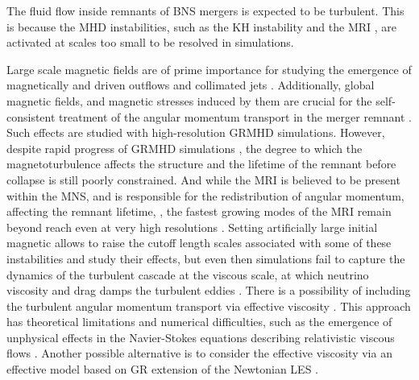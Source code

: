 
The fluid flow inside remnants of \ac{BNS} mergers is expected to be turbulent. 
This is because the \ac{MHD} instabilities,
such as the \ac{KH} instability and the \ac{MRI} \citep{Balbus:1991}, are  
activated at scales too small to be resolved in simulations.

Large scale magnetic fields are of prime importance for studying the emergence of magnetically 
and driven outflows and collimated jets  \cite{Rezzolla:2011da,Bucciantini:2011kx,Siegel:2014ita,Ruiz:2016rai,Metzger:2018uni}.
%
Additionally, global magnetic fields, and magnetic stresses induced by them are crucial for the self-consistent treatment of the angular momentum transport in the merger remnant \citep{Duez:2006qe,Kiuchi:2014hja,Guilet:2016sqd,Kiuchi:2017zzg}.
%
Such effects are studied with high-resolution \ac{GRMHD} simulations. 
However, despite rapid progress of \ac{GRMHD} simulations \citep{Rezzolla:2011da,Kiuchi:2014hja,Ruiz:2016rai},
the degree to which the magnetoturbulence affects the structure and the 
lifetime of the remnant before collapse is still poorly constrained.
And while the \ac{MRI} is believed to be present within the 
\ac{MNS}, and is responsible for the redistribution of angular momentum, affecting the 
remnant lifetime, \citep{Duez:2006qe,Siegel:2013nrw}, 
the fastest growing modes of the \ac{MRI} remain beyond 
reach even at very high resolutions \citep{Kiuchi:2014hja}.
%
Setting artificially large initial magnetic allows to raise the cutoff length scales associated 
with some of these instabilities and study their effects, but even then simulations fail to capture 
the dynamics of the turbulent cascade at the viscous scale, at which neutrino viscosity and drag damps 
the turbulent eddies \citep{Guilet:2016sqd}. 
%
There is a possibility of including the turbulent angular momentum transport via effective viscosity
\cite{Duez:2004nf}. 
This approach has theoretical limitations and numerical difficulties, 
such as the emergence of unphysical effects in the Navier-Stokes equations describing relativistic 
viscous flows \citep[\eg][]{Hiscock:1985}.
%
Another possible alternative is to consider the effective viscosity via an effective model based on 
\ac{GR} extension of the Newtonian \ac{LES} \citep[\eg][]{Miesch:2015les}. 
